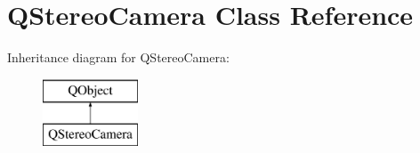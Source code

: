 \hypertarget{class_q_stereo_camera}{}\section{Q\+Stereo\+Camera Class Reference}
\label{class_q_stereo_camera}
Inheritance diagram for Q\+Stereo\+Camera\+:\begin{figure}[H]
\begin{center}
\leavevmode
\includegraphics[height=2.000000cm]{class_q_stereo_camera}
\end{center}
\end{figure}
